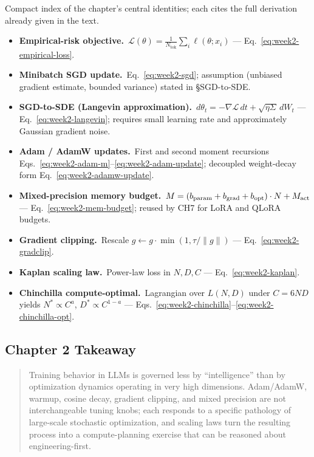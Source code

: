 \begin{derivledger}
Compact index of the chapter's central identities; each cites the full
derivation already given in the text.
\begin{itemize}
  \item \textbf{Empirical-risk objective.}\
        $\mathcal{L}(\theta) = \tfrac{1}{N_{\mathrm{tok}}} \sum_i \ell(\theta; x_i)$
        --- Eq.~\eqref{eq:week2-empirical-loss}.
  \item \textbf{Minibatch SGD update.}\
        Eq.~\eqref{eq:week2-sgd}; assumption (unbiased gradient
        estimate, bounded variance) stated in §SGD-to-SDE.
  \item \textbf{SGD-to-SDE (Langevin approximation).}\
        $d\theta_t = -\nabla \mathcal{L}\, dt + \sqrt{\eta \Sigma}\, dW_t$
        --- Eq.~\eqref{eq:week2-langevin}; requires small learning rate
        and approximately Gaussian gradient noise.
  \item \textbf{Adam / AdamW updates.}\
        First and second moment recursions
        Eqs.~\eqref{eq:week2-adam-m}--\eqref{eq:week2-adam-update};
        decoupled weight-decay form Eq.~\eqref{eq:week2-adamw-update}.
  \item \textbf{Mixed-precision memory budget.}\
        $M = (b_{\rm param} + b_{\rm grad} + b_{\rm opt}) \cdot N + M_{\rm act}$
        --- Eq.~\eqref{eq:week2-mem-budget}; reused by CH7 for LoRA and
        QLoRA budgets.
  \item \textbf{Gradient clipping.}\
        Rescale $g \leftarrow g \cdot \min(1, \tau / \|g\|)$
        --- Eq.~\eqref{eq:week2-gradclip}.
  \item \textbf{Kaplan scaling law.}\
        Power-law loss in $N, D, C$ --- Eq.~\eqref{eq:week2-kaplan}.
  \item \textbf{Chinchilla compute-optimal.}\
        Lagrangian over $L(N,D)$ under $C = 6ND$ yields
        $N^* \propto C^a$, $D^* \propto C^{1-a}$
        --- Eqs.~\eqref{eq:week2-chinchilla}--\eqref{eq:week2-chinchilla-opt}.
\end{itemize}
\end{derivledger}

\subsection{Chapter 2 Takeaway}

\begin{quote}
Training behavior in LLMs is governed less by ``intelligence'' than by
optimization dynamics operating in very high dimensions. Adam/AdamW,
warmup, cosine decay, gradient clipping, and mixed precision are not
interchangeable tuning knobs; each responds to a specific pathology of
large-scale stochastic optimization, and scaling laws turn the resulting
process into a compute-planning exercise that can be reasoned about
engineering-first.
\end{quote}
